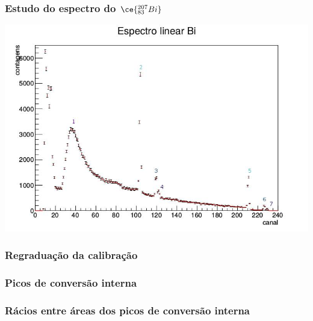 \documentclass[10pt]{beamer}
\begin{document}
\begin{frame}\frametitle{Estudo do espectro do $\ce{^{207}_{83}Bi}$}

 
   \centering
   \includegraphics[scale=0.25]{espectro_bi.jpg}
  

\end{frame}

\begin{frame}\frametitle{Regraduação da calibração}

\end{frame}

\begin{frame}\frametitle{Picos de conversão interna}

  

\end{frame}

\begin{frame}\frametitle{Rácios entre áreas dos picos de conversão interna}

 

\end{frame}
\end{document}
